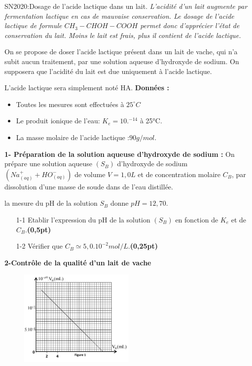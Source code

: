 \documentclass[12pt]{article}
\begin{document}
\begin{Box2}{SN2020:Dosage de l’acide lactique dans un lait.}
  \emph{L’acidité d’un lait augmente par fermentation lactique en cas de mauvaise conservation. Le dosage de
l’acide lactique de formule $CH_3-CHOH-COOH$ permet donc d’apprécier l’état de conservation du lait.
Moins le lait est frais, plus il contient de l’acide lactique.}
  
On se propose de doser l’acide lactique présent dans un lait de vache, qui n’a subit aucun traitement, par une
solution aqueuse d’hydroxyde de sodium. On supposera que l’acidité du lait est due uniquement à l’acide
lactique.

L’acide lactique sera simplement noté HA.
  \textbf{Données : }
\begin{itemize}
  \item Toutes les mesures sont effectuées à $25^{\circ}C$
  \item Le produit ionique de l’eau: $K_e = 10.^{-14}$ à 25°C.
  \item La masse molaire de l’acide lactique :$90 g/mol$.
 
\end{itemize}

  \textbf{1- Préparation de la solution aqueuse d’hydroxyde de sodium :}
  On prépare une solution aqueuse $(S_B )$ d’hydroxyde de sodium $(Na^+_{(aq)} + HO^-_{(aq)})$ de volume $V=1,0L$ et de concentration molaire $C_B$, par dissolution d'une masse de soude dans de l'eau distillée.

  la mesure du pH de la solution $S_B$ donne $pH = 12,70$.

\begin{enumerate}
  \item[1-1] Etablir l’expression du pH de la solution $(S_B)$ en fonction de $K_e$ et de $C_B$.\textbf{(0,5pt)}
  \item[1-2] Vérifier que $C_B \simeq 5,0. 10^{-2} mol/L$.\textbf{(0,25pt)}
\end{enumerate}

  \textbf{2-Contrôle de la qualité d’un lait de vache}

  \begin{figure}
  \begin{center}
	  \vspace{-2cm}
	\includegraphics[width=0.5\textwidth]{./img/new_vache.png}
  \end{center}
\end{figure}




\end{Box2}
\end{document}
